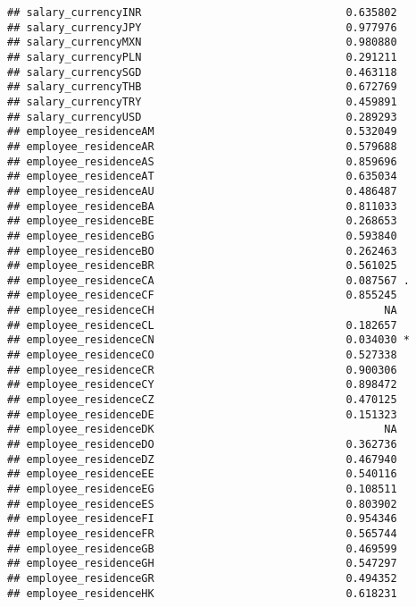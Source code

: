 \documentclass[
]{article}
\begin{document}
\begin{verbatim}
## salary_currencyINR                                0.635802    
## salary_currencyJPY                                0.977976    
## salary_currencyMXN                                0.980880    
## salary_currencyPLN                                0.291211    
## salary_currencySGD                                0.463118    
## salary_currencyTHB                                0.672769    
## salary_currencyTRY                                0.459891    
## salary_currencyUSD                                0.289293    
## employee_residenceAM                              0.532049    
## employee_residenceAR                              0.579688    
## employee_residenceAS                              0.859696    
## employee_residenceAT                              0.635034    
## employee_residenceAU                              0.486487    
## employee_residenceBA                              0.811033    
## employee_residenceBE                              0.268653    
## employee_residenceBG                              0.593840    
## employee_residenceBO                              0.262463    
## employee_residenceBR                              0.561025    
## employee_residenceCA                              0.087567 .  
## employee_residenceCF                              0.855245    
## employee_residenceCH                                    NA    
## employee_residenceCL                              0.182657    
## employee_residenceCN                              0.034030 *  
## employee_residenceCO                              0.527338    
## employee_residenceCR                              0.900306    
## employee_residenceCY                              0.898472    
## employee_residenceCZ                              0.470125    
## employee_residenceDE                              0.151323    
## employee_residenceDK                                    NA    
## employee_residenceDO                              0.362736    
## employee_residenceDZ                              0.467940    
## employee_residenceEE                              0.540116    
## employee_residenceEG                              0.108511    
## employee_residenceES                              0.803902    
## employee_residenceFI                              0.954346    
## employee_residenceFR                              0.565744    
## employee_residenceGB                              0.469599    
## employee_residenceGH                              0.547297    
## employee_residenceGR                              0.494352    
## employee_residenceHK                              0.618231    

\end{verbatim}
\end{document}
